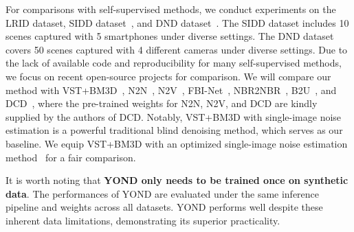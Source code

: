 \documentclass[lettersize,journal]{IEEEtran}
\begin{document}
	For comparisons with self-supervised methods, we conduct experiments on the LRID dataset, SIDD dataset~\cite{CVPR18/SIDD}, and DND dataset~\cite{CVPR17/DND}. The SIDD dataset includes 10 scenes captured with 5 smartphones under diverse settings. The DND dataset covers 50 scenes captured with 4 different cameras under diverse settings. Due to the lack of available code and reproducibility for many self-supervised methods, we focus on recent open-source projects for comparison. We will compare our method with VST+BM3D~\cite{TIP13/VST,BM3D}, N2N~\cite{ICML18/N2N},  N2V~\cite{CVPR19/N2V}, FBI-Net~\cite{CVPR21/FBI}, NBR2NBR~\cite{CVPR21/NBR2NBR}, B2U~\cite{CVPR22/B2U}, and DCD~\cite{ICCV23/DCD}, where the pre-trained weights for N2N, N2V, and DCD are kindly supplied by the authors of DCD.
	Notably, VST+BM3D with single-image noise estimation is a powerful traditional blind denoising method, which serves as our baseline. We equip VST+BM3D with an optimized single-image noise estimation method~\cite{P-G} for a fair comparison.
	
	It is worth noting that \textbf{YOND only needs to be trained once on synthetic data}. The performances of YOND are evaluated under the same inference pipeline and weights across all datasets. YOND performs well despite these inherent data limitations, demonstrating its superior practicality.
	
\end{document}
